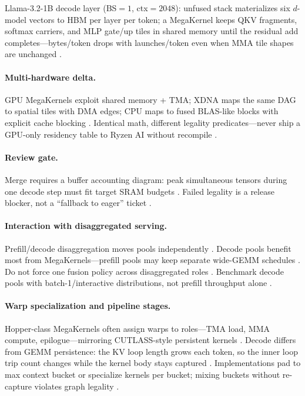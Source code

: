 \begin{example}
Llama-3.2-1B decode layer (BS${=}1$, ctx${=}2048$): unfused stack materializes six $d$-model vectors to HBM per layer per token; a MegaKernel keeps QKV fragments, softmax carriers, and MLP gate/up tiles in shared memory until the residual add completes---bytes/token drops with launches/token even when MMA tile shapes are unchanged \citep{taxbreak2026,dao2022flashattention}.
\end{example}

\paragraph{Multi-hardware delta.} GPU MegaKernels exploit shared memory + TMA; XDNA maps the same DAG to spatial tiles with DMA edges; CPU maps to fused BLAS-like blocks with explicit cache blocking \citep{amd2024xdna,dlbook,yirage2026}. Identical math, different legality predicates---never ship a GPU-only residency table to Ryzen AI without recompile \citep{amd2024aie,liu2024deepseekv3}.

\paragraph{Review gate.} Merge requires a buffer accounting diagram: peak simultaneous tensors during one decode step must fit target SRAM budgets \citep{yirage2026,memoryfloor2026}. Failed legality is a release blocker, not a ``fallback to eager'' ticket \citep{chen2020compilerbasedhardw}.

\paragraph{Interaction with disaggregated serving.} Prefill/decode disaggregation moves pools independently \citep{patel2025llminference,liu2024deepseekv3}. Decode pools benefit most from MegaKernels---prefill pools may keep separate wide-GEMM schedules \citep{dao2023flashdecoding,kwon2023vllm}. Do not force one fusion policy across disaggregated roles \citep{taxbreak2026,memoryfloor2026}. Benchmark decode pools with batch-1/interactive distributions, not prefill throughput alone \citep{patel2025llminference,dao2022flashattention}.

\paragraph{Warp specialization and pipeline stages.} Hopper-class MegaKernels often assign warps to roles---TMA load, MMA compute, epilogue---mirroring CUTLASS-style persistent kernels \citep{semianalysis2024tma,nvidia2022hopper}. Decode differs from GEMM persistence: the KV loop length grows each token, so the inner loop trip count changes while the kernel body stays captured \citep{kwon2023vllm,dao2023flashdecoding}. Implementations pad to max context bucket or specialize kernels per bucket; mixing buckets without re-capture violates graph legality \citep{nvidia2024cudagraphs,yirage2026}.

